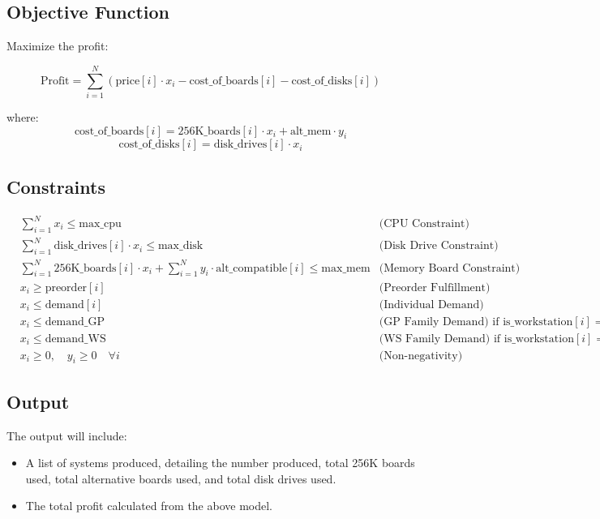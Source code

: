 \documentclass{article}
\begin{document}
\subsection*{Objective Function}

Maximize the profit:

\[
\text{Profit} = \sum_{i=1}^{N} ( \text{price}[i] \cdot x_i - \text{cost\_of\_boards}[i] - \text{cost\_of\_disks}[i] )
\]

where:
\[
\text{cost\_of\_boards}[i] = \text{256K\_boards}[i] \cdot x_i + \text{alt\_mem} \cdot y_i
\]
\[
\text{cost\_of\_disks}[i] = \text{disk\_drives}[i] \cdot x_i
\]

\subsection*{Constraints}

\begin{align*}
    & \sum_{i=1}^{N} x_i \leq \text{max\_cpu} & \text{(CPU Constraint)} \\
    & \sum_{i=1}^{N} \text{disk\_drives}[i] \cdot x_i \leq \text{max\_disk} & \text{(Disk Drive Constraint)} \\
    & \sum_{i=1}^{N} \text{256K\_boards}[i] \cdot x_i + \sum_{i=1}^{N} y_i \cdot \text{alt\_compatible}[i] \leq \text{max\_mem} & \text{(Memory Board Constraint)} \\
    & x_i \geq \text{preorder}[i] & \text{(Preorder Fulfillment)} \\
    & x_i \leq \text{demand}[i] & \text{(Individual Demand)} \\
    & x_i \leq \text{demand\_GP} & \text{(GP Family Demand)} \text{ if } \text{is\_workstation}[i] = \text{false} \\
    & x_i \leq \text{demand\_WS} & \text{(WS Family Demand)} \text{ if } \text{is\_workstation}[i] = \text{true} \\
    & x_i \geq 0, \quad y_i \geq 0 \quad \forall i & \text{(Non-negativity)}
\end{align*}

\subsection*{Output}

The output will include:
\begin{itemize}
    \item A list of systems produced, detailing the number produced, total 256K boards used, total alternative boards used, and total disk drives used.
    \item The total profit calculated from the above model.
\end{itemize}
\end{document}
